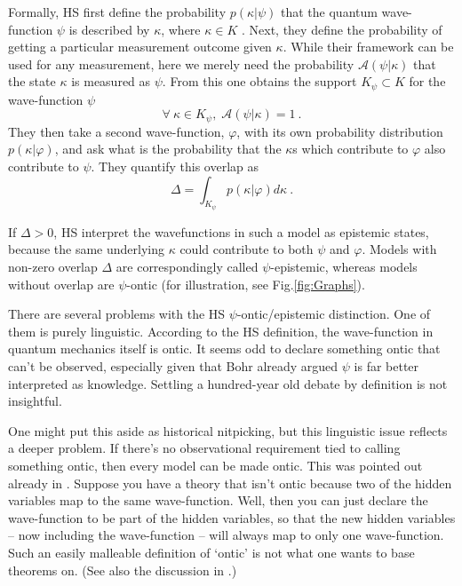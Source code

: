 \documentclass[superscriptaddress,floatfix,nofootinbib,12pt]{revtex4-2}
\begin{document}
Formally, HS first define the probability $p(\kappa\vert\psi)$ that the quantum wave-function $\psi$ is described by $\kappa$, where $\kappa \in K$ \cite{Harrigan2007ProbDistn,Maroney2012Statistical}. Next, they define the probability of getting a particular measurement outcome given $\kappa$. While their framework can be used for any measurement, here we merely need the probability $\mathcal{A}(\psi|\kappa)$ that the state $\kappa$ is measured as $\psi$. From this one obtains the support $K_\psi \subset K$ for the wave-function $\psi$ 
\begin{equation}
    \forall~\kappa\in K_\psi,\;\mathcal{A}(\psi\vert\kappa) = 1 ~.
\end{equation}
They then take a second wave-function, $\varphi$, with its own probability distribution $p(\kappa\vert\varphi)$, and ask what is the probability that the $\kappa$s which contribute to $\varphi$ also contribute to $\psi$. They quantify this overlap as
\begin{equation}
\Delta =\int_{K_\psi} p(\kappa\vert\varphi) d\kappa~.
\end{equation}

If $\Delta>0$, HS interpret the wavefunctions in such a model as epistemic states, because the same underlying $\kappa$ could contribute to both $\psi$ and $\varphi$. Models with non-zero overlap $\Delta$ are correspondingly called $\psi$-epistemic, whereas models without overlap are $\psi$-ontic (for illustration, see Fig.\ref{fig:Graphs}).

There are several problems with the HS $\psi$-ontic/epistemic distinction. One of them is purely linguistic. According to the HS definition, the wave-function in quantum mechanics itself is ontic. It seems odd to declare something ontic that can't be observed, especially given that Bohr already argued $\psi$ is far better interpreted as knowledge. Settling a hundred-year old debate by definition is not insightful. 

One might put this aside as historical nitpicking, but this linguistic issue reflects a deeper problem. If there's no observational requirement tied to calling something ontic, then every model can be made ontic. This was pointed out already in \cite{Schlosshauer2012Implications}. Suppose you have a theory that isn't ontic because two of the hidden variables map to the same wave-function. Well, then you can just declare the wave-function to be part of the hidden variables, so that the new hidden variables -- now including the wave-function -- will always map to only one wave-function. Such an easily malleable definition of `ontic' is not what one wants to base theorems on.
(See also the discussion in \cite{Leifer_2014}.)
\end{document}
